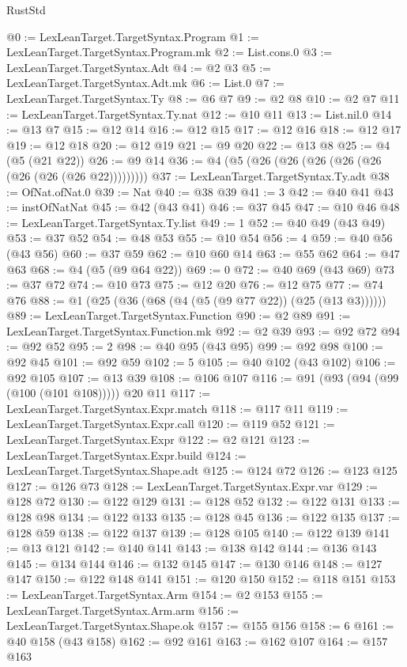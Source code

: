 \begin{lexlean}{RustStd}
\begin{coremodule}
{\begin{coremodule}
{{{{{{{{{{{{{{{{{{{{{{{{{{{{{{{{{{{{{{{{{{{{{{{@0 := LexLeanTarget.TargetSyntax.Program
@1 := LexLeanTarget.TargetSyntax.Program.mk
@2 := List.cons.{0}
@3 := LexLeanTarget.TargetSyntax.Adt
@4 := @2 @3
@5 := LexLeanTarget.TargetSyntax.Adt.mk
@6 := List.{0}
@7 := LexLeanTarget.TargetSyntax.Ty
@8 := @6 @7
@9 := @2 @8
@10 := @2 @7
@11 := LexLeanTarget.TargetSyntax.Ty.nat
@12 := @10 @11
@13 := List.nil.{0}
@14 := @13 @7
@15 := @12 @14
@16 := @12 @15
@17 := @12 @16
@18 := @12 @17
@19 := @12 @18
@20 := @12 @19
@21 := @9 @20
@22 := @13 @8
@25 := @4 (@5 (@21 @22))
@26 := @9 @14
@36 := @4 (@5 (@26 (@26 (@26 (@26 (@26 (@26 (@26 (@26 @22)))))))))
@37 := LexLeanTarget.TargetSyntax.Ty.adt
@38 := OfNat.ofNat.{0}
@39 := Nat
@40 := @38 @39
@41 := 3
@42 := @40 @41
@43 := instOfNatNat
@45 := @42 (@43 @41)
@46 := @37 @45
@47 := @10 @46
@48 := LexLeanTarget.TargetSyntax.Ty.list
@49 := 1
@52 := @40 @49 (@43 @49)
@53 := @37 @52
@54 := @48 @53
@55 := @10 @54
@56 := 4
@59 := @40 @56 (@43 @56)
@60 := @37 @59
@62 := @10 @60 @14
@63 := @55 @62
@64 := @47 @63
@68 := @4 (@5 (@9 @64 @22))
@69 := 0
@72 := @40 @69 (@43 @69)
@73 := @37 @72
@74 := @10 @73
@75 := @12 @20
@76 := @12 @75
@77 := @74 @76
@88 := @1 (@25 (@36 (@68 (@4 (@5 (@9 @77 @22)) (@25 (@13 @3))))))
@89 := LexLeanTarget.TargetSyntax.Function
@90 := @2 @89
@91 := LexLeanTarget.TargetSyntax.Function.mk
@92 := @2 @39
@93 := @92 @72
@94 := @92 @52
@95 := 2
@98 := @40 @95 (@43 @95)
@99 := @92 @98
@100 := @92 @45
@101 := @92 @59
@102 := 5
@105 := @40 @102 (@43 @102)
@106 := @92 @105
@107 := @13 @39
@108 := @106 @107
@116 := @91 (@93 (@94 (@99 (@100 (@101 @108))))) @20 @11
@117 := LexLeanTarget.TargetSyntax.Expr.match
@118 := @117 @11
@119 := LexLeanTarget.TargetSyntax.Expr.call
@120 := @119 @52
@121 := LexLeanTarget.TargetSyntax.Expr
@122 := @2 @121
@123 := LexLeanTarget.TargetSyntax.Expr.build
@124 := LexLeanTarget.TargetSyntax.Shape.adt
@125 := @124 @72
@126 := @123 @125
@127 := @126 @73
@128 := LexLeanTarget.TargetSyntax.Expr.var
@129 := @128 @72
@130 := @122 @129
@131 := @128 @52
@132 := @122 @131
@133 := @128 @98
@134 := @122 @133
@135 := @128 @45
@136 := @122 @135
@137 := @128 @59
@138 := @122 @137
@139 := @128 @105
@140 := @122 @139
@141 := @13 @121
@142 := @140 @141
@143 := @138 @142
@144 := @136 @143
@145 := @134 @144
@146 := @132 @145
@147 := @130 @146
@148 := @127 @147
@150 := @122 @148 @141
@151 := @120 @150
@152 := @118 @151
@153 := LexLeanTarget.TargetSyntax.Arm
@154 := @2 @153
@155 := LexLeanTarget.TargetSyntax.Arm.arm
@156 := LexLeanTarget.TargetSyntax.Shape.ok
@157 := @155 @156
@158 := 6
@161 := @40 @158 (@43 @158)
@162 := @92 @161
@163 := @162 @107
@164 := @157 @163
}}}}}}}}}}}}}}}}}}}}}}}}}}}}}}}}}}}}}}}}}}}}}}}
\end{coremodule}}
\end{coremodule}
\end{lexlean}
